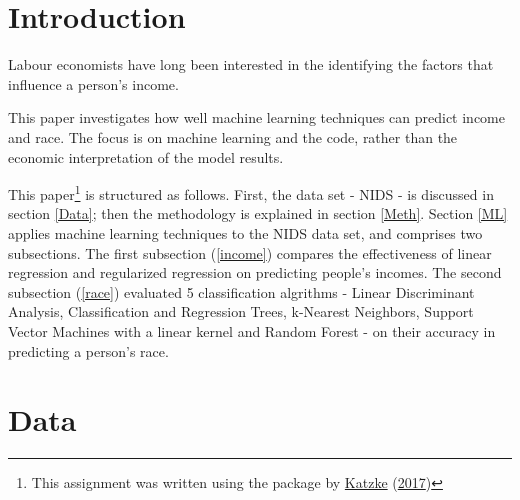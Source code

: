 \documentclass[11pt,preprint, authoryear]{elsarticle}
\numberwithin{equation}{section}
\numberwithin{figure}{section}
\numberwithin{table}{section}
\let\rmarkdownfootnote\footnote%
\def\footnote{\protect\rmarkdownfootnote}
\begin{document}
\renewcommand{\contentsname}{Table of Contents}
{\tableofcontents}

\pagestyle{fancy}
\chead{}
\rhead{}
\lfoot{}
\lhead{}
\cfoot{}


\headsep 35pt %




\newpage

\hypertarget{introduction}{%
\section{\texorpdfstring{Introduction
\label{Introduction}}{Introduction }}\label{introduction}}

Labour economists have long been interested in the identifying the
factors that influence a person's income.

This paper investigates how well machine learning techniques can predict
income and race. The focus is on machine learning and the code, rather
than the economic interpretation of the model results.

This paper\footnote{This assignment was written using the package by
  \protect\hyperlink{ref-Texevier}{Katzke}
  (\protect\hyperlink{ref-Texevier}{2017})} is structured as follows.
First, the data set - NIDS - is discussed in section \ref{Data}; then
the methodology is explained in section \ref{Meth}. Section \ref{ML}
applies machine learning techniques to the NIDS data set, and comprises
two subsections. The first subsection (\ref{income}) compares the
effectiveness of linear regression and regularized regression on
predicting people's incomes. The second subsection (\ref{race})
evaluated 5 classification algrithms - Linear Discriminant Analysis,
Classification and Regression Trees, k-Nearest Neighbors, Support Vector
Machines with a linear kernel and Random Forest - on their accuracy in
predicting a person's race.

\hypertarget{data}{%
\section{\texorpdfstring{Data \label{Data}}{Data }}\label{data}}
\end{document}
